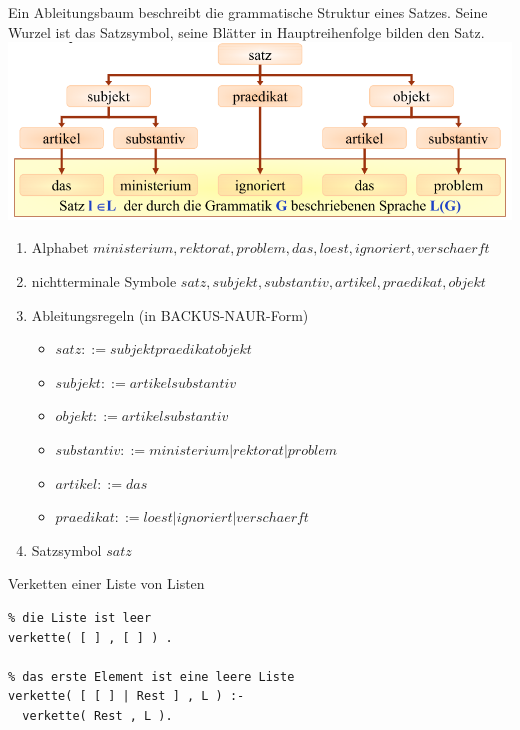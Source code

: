 \documentclass[a4paper]{article}
\begin{document}
\begin{multicols}{3}
  Ein Ableitungsbaum beschreibt die grammatische Struktur eines Satzes.
  Seine Wurzel ist das Satzsymbol, seine Blätter in Hauptreihenfolge
  bilden den Satz.
  \includegraphics[width=\linewidth]{Assets/Logik-ableitungsbaum-beispiel.png}

  \begin{enumerate}
    \itemsep1pt\parskip0pt
    \item
          Alphabet
          $ministerium, rektorat, problem, das, loest, ignoriert, verschaerft$
    \item
          nichtterminale Symbole
          $satz, subjekt, substantiv, artikel, praedikat,objekt$
    \item
          Ableitungsregeln (in BACKUS-NAUR-Form)

          \begin{itemize}
            \item
                  $satz ::= subjekt praedikat objekt$
            \item
                  $subjekt ::= artikel substantiv$
            \item
                  $objekt ::=  artikel substantiv$
            \item
                  $substantiv ::= ministerium | rektorat | problem$
            \item
                  $artikel ::= das$
            \item
                  $praedikat ::= loest | ignoriert | verschaerft$
          \end{itemize}
    \item
          Satzsymbol $satz$
  \end{enumerate}

  Verketten einer Liste von Listen

  \begin{verbatim}
% die Liste ist leer
verkette( [ ] , [ ] ) .

% das erste Element ist eine leere Liste
verkette( [ [ ] | Rest ] , L ) :-
  verkette( Rest , L ).


\end{verbatim}
\end{multicols}
\end{document}
